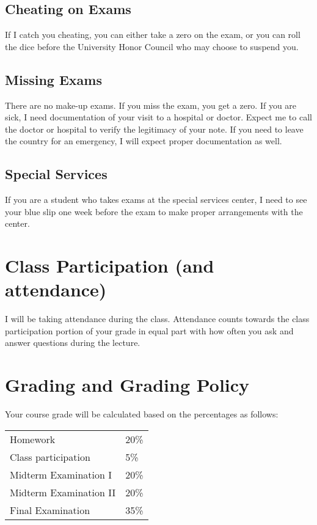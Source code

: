 \documentclass[12pt]{article}
\begin{document}
\subsection*{Cheating on Exams}

If I catch you cheating, you can either take a zero on the exam, or you can roll the dice before the University Honor Council who may choose to suspend you.


\subsection*{Missing Exams}

There are no make-up exams. If you miss the exam, you get a zero. If you are sick, I need documentation of your visit to a hospital or doctor. Expect me to call the doctor or hospital to verify the legitimacy of your note. If you need to leave the country for an emergency, I will expect proper documentation as well.

\subsection*{Special Services}

If you are a student who takes exams at the special services center, I need to see your blue slip one week before the exam to make proper arrangements with the center.

\section*{Class Participation (and attendance)}

I will be taking attendance during the class. Attendance counts towards the class participation portion of your grade in equal part with how often you ask and answer questions during the lecture.


\section*{Grading and Grading Policy}\label{sec:grading}

Your course grade will be calculated based on the percentages as follows: 

\begin{table}[h]
\centering
\begin{tabular}{l|l}
Homework & 20\% \\
Class participation & 5\% \\
Midterm Examination I & 20\%\\
Midterm Examination II & 20\%\\
Final Examination & 35\%
\end{tabular}
\end{table}
\FloatBarrier
\end{document}
